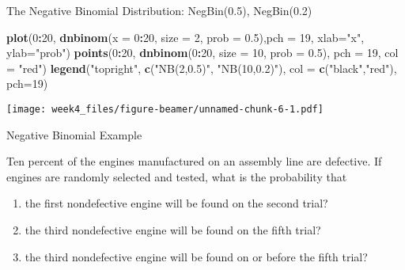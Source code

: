 \documentclass[12pt,ignorenonframetext,compress]{beamer}
\newenvironment{Shaded}{\begin{snugshade}}{\end{snugshade}}
\newcommand{\KeywordTok}[1]{\textcolor[rgb]{0.13,0.29,0.53}{\textbf{#1}}}
\newcommand{\DataTypeTok}[1]{\textcolor[rgb]{0.13,0.29,0.53}{#1}}
\newcommand{\DecValTok}[1]{\textcolor[rgb]{0.00,0.00,0.81}{#1}}
\newcommand{\FloatTok}[1]{\textcolor[rgb]{0.00,0.00,0.81}{#1}}
\newcommand{\StringTok}[1]{\textcolor[rgb]{0.31,0.60,0.02}{#1}}
\newcommand{\OperatorTok}[1]{\textcolor[rgb]{0.81,0.36,0.00}{\textbf{#1}}}
\newcommand{\NormalTok}[1]{#1}
\let\oldShaded\Shaded
\let\endoldShaded\endShaded
\renewenvironment{Shaded}{\scriptsize\oldShaded}{\endoldShaded}
\begin{document}
\begin{frame}[fragile]{The Negative Binomial Distribution: NegBin(0.5),
NegBin(0.2)}

\begin{Shaded}
\begin{Highlighting}[]
\KeywordTok{plot}\NormalTok{(}\DecValTok{0}\OperatorTok{:}\DecValTok{20}\NormalTok{, }\KeywordTok{dnbinom}\NormalTok{(}\DataTypeTok{x =} \DecValTok{0}\OperatorTok{:}\DecValTok{20}\NormalTok{, }\DataTypeTok{size =} \DecValTok{2}\NormalTok{, }\DataTypeTok{prob =} \FloatTok{0.5}\NormalTok{),}\DataTypeTok{pch =} \DecValTok{19}\NormalTok{, }\DataTypeTok{xlab=}\StringTok{"x"}\NormalTok{, }\DataTypeTok{ylab=}\StringTok{"prob"}\NormalTok{)}
\KeywordTok{points}\NormalTok{(}\DecValTok{0}\OperatorTok{:}\DecValTok{20}\NormalTok{, }\KeywordTok{dnbinom}\NormalTok{(}\DecValTok{0}\OperatorTok{:}\DecValTok{20}\NormalTok{, }\DataTypeTok{size =} \DecValTok{10}\NormalTok{, }\DataTypeTok{prob =} \FloatTok{0.5}\NormalTok{), }\DataTypeTok{pch =} \DecValTok{19}\NormalTok{, }\DataTypeTok{col =} \StringTok{"red"}\NormalTok{)}
\KeywordTok{legend}\NormalTok{(}\StringTok{"topright"}\NormalTok{, }\KeywordTok{c}\NormalTok{(}\StringTok{"NB(2,0.5)"}\NormalTok{, }\StringTok{"NB(10,0.2)"}\NormalTok{), }\DataTypeTok{col =} \KeywordTok{c}\NormalTok{(}\StringTok{"black"}\NormalTok{,}\StringTok{"red"}\NormalTok{), }\DataTypeTok{pch=}\DecValTok{19}\NormalTok{)}
\end{Highlighting}
\end{Shaded}

\texttt{[image: week4\_files/figure-beamer/unnamed-chunk-6-1.pdf]}

\end{frame}

\begin{frame}{Negative Binomial Example}

\begin{example}[Engines]
Ten percent of the engines manufactured on an assembly line are defective. If engines are randomly selected and tested, what is the probability that
\begin{enumerate}
\item the first nondefective engine will be found on the second trial?
\item the third nondefective engine will be found on the fifth trial?
\item the third nondefective engine will be found on or before the fifth trial? 
\end{enumerate}
\end{example}

\end{frame}
\end{document}

